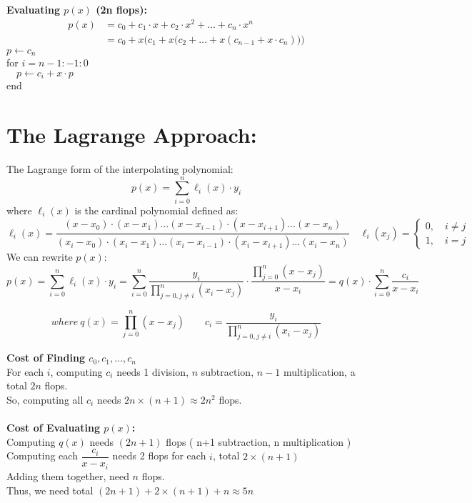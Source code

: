 \documentclass [9 pt]{article}
\theoremstyle{definition}
\begin{document}
\textbf{Evaluating $p(x)$ (2n flops):}
\begin{align*}
	p(x) 
	&= c_0 + c_1\cdot x + c_2 \cdot x^2 + \ldots + c_n \cdot x^n\\
	&= c_0 + x\bigg(c_1 + x \Big( c_2 + \ldots + x(c_{n-1} + x \cdot c_n) \Big) \bigg)
\end{align*}
$p \gets c_n $\\
for $i = n - 1 : -1 : 0$\\
$\quad p \gets c_i + x\cdot p$\\
end \\







\newpage
\section*{The Lagrange Approach:}
The Lagrange form of the interpolating polynomial:
$$p(x) = \sum_{i = 0}^n \ell_i(x) \cdot y_i$$
where $\ell_i(x)$ is the cardinal polynomial defined as:
$$\ell_i(x) = \dfrac{(x - x_0) \cdot (x - x_1) \ldots (x - x_{i - 1}) \cdot (x - x_{i+1}) \ldots (x- x_n) }{(x_i - x_0) \cdot (x_i - x_1) \ldots (x_i - x_{i - 1}) \cdot (x_i - x_{i+1}) \ldots (x_i - x_n)} \quad 
\ell_i(x_j) = \begin{cases}
	0, \quad i \neq j\\
	1, \quad i = j
\end{cases}$$
We can rewrite $p(x)$:
$$ p(x) = \sum_{i = 0}^n \ell_i(x) \cdot y_i = \sum_{i = 0}^n \dfrac{y_i}{ \prod_{j = 0, j \neq i}^{n} (x_i - x_j)} \cdot \dfrac{ \prod_{j = 0}^n (x - x_j) }{x - x_i} = q(x) \cdot \sum_{i = 0}^{n} \dfrac{c_i}{ x - x_i } $$

$$where \ q(x) = \prod_{j = 0}^n (x - x_j) \quad\quad c_i =  \dfrac{y_i}{ \prod_{j = 0, j \neq i}^{n} (x_i - x_j)} $$

\textbf{Cost of Finding $c_0, c_1, \ldots, c_n$}\\
For each $i$, computing $c_i$ needs 1 division, $n$ subtraction, $n - 1$ multiplication, a total $2n$ flops.\\
So, computing all $c_i$ needs $2n \times (n + 1) \approx 2n^2$ flops.\\
\\
\textbf{Cost of Evaluating $p(x)$:} \\
Computing $q(x)$ needs $(2n + 1)$ flops ( n+1 subtraction, n multiplication )\\
Computing each $\dfrac{c_i}{x - x_i}$ needs 2 flops for each $i$, total $2\times(n+1)$ \\
Adding them together, need $n$ flops. \\
Thus, we need total $(2n + 1) + 2\times(n+1) + n \approx 5n $
\end{document}
